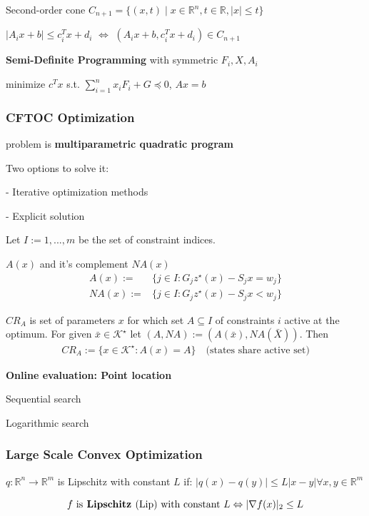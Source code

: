 Second-order cone
$C_{n+1}=\{ (x,t)\mid
x\in\mathbb{R}^{n}, t\in \mathbb{R}, |x|\le t \}$

$|A_ix+b|\le c_i^T x+d_i$
$\Leftrightarrow$
$(A_ix+b, c_i^T x+d_i)\in C_{n+1}$

\textbf{Semi-Definite Programming} with symmetric $F_i,X,A_i$

minimize $c^T x$
s.t.
$\sum_{i=1}^{n}x_iF_i+G\preceq0$,
$Ax=b$

\subsubsection{CFTOC Optimization}

 problem is
\textbf{multiparametric quadratic program}

Two options to solve it:

- Iterative optimization methods

- Explicit solution

Let $I := {1, . . . , m}$ be the set of constraint indices.
\begin{definition}
  $A(x)$ and it's complement $NA(x)$
  \begin{align*}
    A(x) :=  & \{j\in I: G_jz^\star(x) - S_jx = w_j \} \\
    NA(x) := & \{j\in I: G_jz^\star(x) - S_jx < w_j \}
  \end{align*}
\end{definition}

\begin{definition}
  $CR_A$ is set of parameters $x$ for which set $A\subseteq I$ of
  constraints $i$ active at the optimum.
  For given $\bar{x} \in \mathcal{K}^\star$ let $(A,NA) :=
  (A(\bar{x}), NA(\bar{X}))$. Then
  \begin{align*}
    CR_A := \{x\in\mathcal{K}^\star : A(x) = A\} \quad \text{(states
    share active set)}
  \end{align*}
\end{definition}

\textbf{Online evaluation: Point location}

Sequential search

Logarithmic search

\subsubsection{Large Scale Convex Optimization}

\begin{definition}
  $q: \mathbb{R}^{n} \rightarrow \mathbb{R}^{m}$
  is Lipschitz with constant $L$ if:
  $|q(x)-q(y)| \le L |x-y| \forall x,y \in \mathbb{R}^{m}$
\end{definition}
\vspace{-4mm}
$$f \text{ is\textbf{ Lipschitz }(Lip) with constant } L
\Leftrightarrow
|\nabla f(x)|_2\le L$$
\vspace{-4mm}

